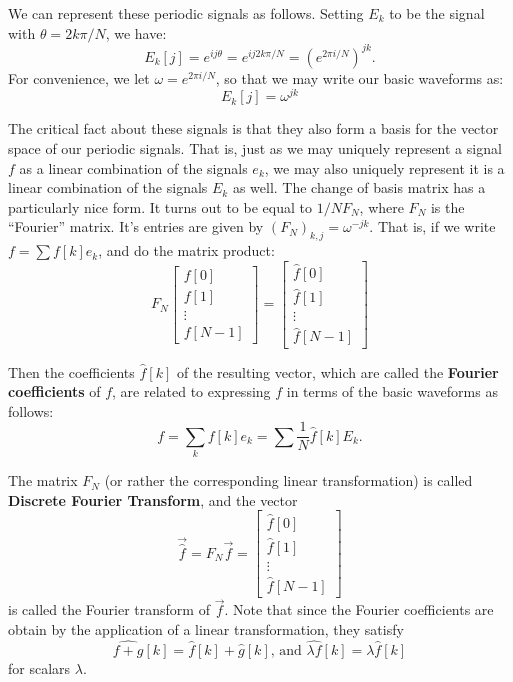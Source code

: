 \documentclass[12pt]{report}
\theoremstyle{plain}
\begin{document}
We can represent these periodic signals as follows. Setting $E_k$ to be the signal with $\theta= 2k\pi/N$, we have:
\[E_k[j] = e^{ij\theta} = e^{ij2k\pi/N} = \left(e^{2\pi i / N}\right)^{jk}. \]
For convenience, we let $\omega = e^{2 \pi i / N}$, so that we may write our basic waveforms as:
\[E_k[j] = \omega^{jk} \]

The critical fact about these signals is that they also form a basis for the vector space of our periodic signals. That is, just as we may uniquely represent a signal $f$ as a linear combination of the signals $e_k$, we may also uniquely represent it is a linear combination of the signals $E_k$ as well. The change of basis matrix has a particularly nice form. It turns out to be equal to $1/N F_N$, where $F_N$ is the ``Fourier'' matrix. It's entries are given by $(F_N)_{k,j} = \omega^{-jk}$. That is, if we write $f = \sum f[k] e_k$, and do the matrix product:
\[
F_N
\left[
\begin{matrix}
	f[0] \\
	f[1] \\
	\vdots \\
	f[N-1]
\end{matrix}
\right]
=
\left[
\begin{matrix}
	\hat f[0] \\
	\hat f[1] \\
	\vdots \\
	\hat f[N-1]
\end{matrix}
\right]
\]

Then the coefficients $\hat f[k]$ of the resulting vector, which are called the \textbf{Fourier coefficients} of $f$, are related to expressing $f$ in terms of the basic waveforms as follows:
\begin{equation} \label{fourier basis expression}
f = \sum_k f[k] e_k = \sum \frac 1 N \hat f[k] E_k.
\end{equation}

The matrix $F_N$ (or rather the corresponding linear transformation) is called \textbf{Discrete Fourier Transform}, and the vector
\[\vec{\hat f} = F_N \vec f =
\left[
\begin{matrix}
	\hat f[0] \\
	\hat f[1] \\
	\vdots \\
	\hat f[N-1]
\end{matrix}
\right]
\]
is called the Fourier transform of $\vec f$. Note that since the Fourier coefficients are obtain by the application of a linear transformation, they satisfy
\begin{equation} \label{hat is linear}
\widehat{f + g}[k] = \hat f[k] + \hat g[k] \text{, and }\widehat{\lambda f}[k] = \lambda \hat f[k]
\end{equation}
for scalars $\lambda$.
\end{document}
